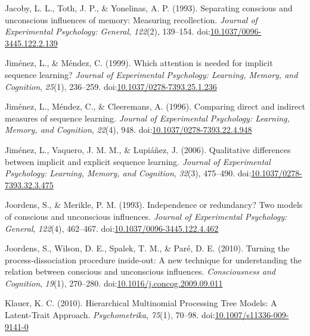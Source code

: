 \documentclass[man]{apa6}
\theoremstyle{definition}
\theoremstyle{definition}
\theoremstyle{definition}
\theoremstyle{remark}
\begin{document}
\hypertarget{ref-jacoby_separating_1993}{}
Jacoby, L. L., Toth, J. P., \& Yonelinas, A. P. (1993). Separating
conscious and unconscious influences of memory: Measuring recollection.
\emph{Journal of Experimental Psychology: General}, \emph{122}(2),
139--154.
doi:\href{https://doi.org/10.1037/0096-3445.122.2.139}{10.1037/0096-3445.122.2.139}

\hypertarget{ref-jimenez_which_1999}{}
Jiménez, L., \& Méndez, C. (1999). Which attention is needed for
implicit sequence learning? \emph{Journal of Experimental Psychology:
Learning, Memory, and Cognition}, \emph{25}(1), 236--259.
doi:\href{https://doi.org/10.1037/0278-7393.25.1.236}{10.1037/0278-7393.25.1.236}

\hypertarget{ref-jimenez_comparing_1996}{}
Jiménez, L., Méndez, C., \& Cleeremans, A. (1996). Comparing direct and
indirect measures of sequence learning. \emph{Journal of Experimental
Psychology: Learning, Memory, and Cognition}, \emph{22}(4), 948.
doi:\href{https://doi.org/10.1037/0278-7393.22.4.948}{10.1037/0278-7393.22.4.948}

\hypertarget{ref-jimenez_qualitative_2006}{}
Jiménez, L., Vaquero, J. M. M., \& Lupiáñez, J. (2006). Qualitative
differences between implicit and explicit sequence learning.
\emph{Journal of Experimental Psychology: Learning, Memory, and
Cognition}, \emph{32}(3), 475--490.
doi:\href{https://doi.org/10.1037/0278-7393.32.3.475}{10.1037/0278-7393.32.3.475}

\hypertarget{ref-joordens_independence_1993}{}
Joordens, S., \& Merikle, P. M. (1993). Independence or redundancy? Two
models of conscious and unconscious influences. \emph{Journal of
Experimental Psychology: General}, \emph{122}(4), 462--467.
doi:\href{https://doi.org/10.1037/0096-3445.122.4.462}{10.1037/0096-3445.122.4.462}

\hypertarget{ref-joordens_turning_2010}{}
Joordens, S., Wilson, D. E., Spalek, T. M., \& Paré, D. E. (2010).
Turning the process-dissociation procedure inside-out: A new technique
for understanding the relation between conscious and unconscious
influences. \emph{Consciousness and Cognition}, \emph{19}(1), 270--280.
doi:\href{https://doi.org/10.1016/j.concog.2009.09.011}{10.1016/j.concog.2009.09.011}

\hypertarget{ref-klauer_hierarchical_2010}{}
Klauer, K. C. (2010). Hierarchical Multinomial Processing Tree Models: A
Latent-Trait Approach. \emph{Psychometrika}, \emph{75}(1), 70--98.
doi:\href{https://doi.org/10.1007/s11336-009-9141-0}{10.1007/s11336-009-9141-0}
\end{document}

